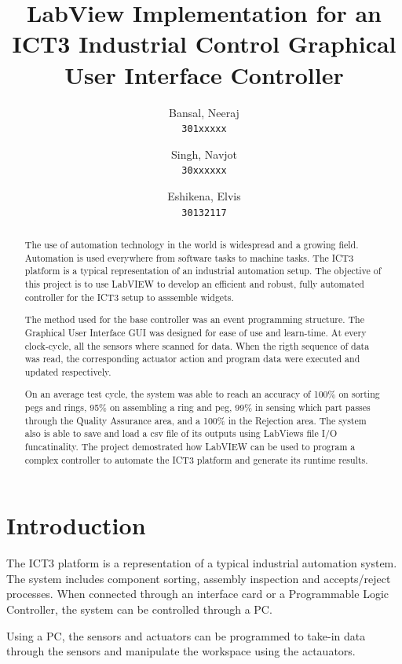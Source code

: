 \documentclass[12pt]{article}
\title{\textbf{LabView Implementation for an ICT3 Industrial Control Graphical User Interface Controller}}
\author{
  Bansal, Neeraj\\
  \texttt{301xxxxx}
  \and
  Singh, Navjot\\
  \texttt{30xxxxxx}
  \and
  Eshikena, Elvis\\
  \texttt{30132117}
}
\begin{document}
\maketitle

\begin{abstract}
The use of automation technology in the world is wide\-spread and a growing field.
Automation is used every\-where from software tasks to machine tasks. The ICT3 platform
is a typical representation of an industrial automation setup. The objective of this
project is to use LabVIEW to develop an efficient and robust, fully automated 
controller for the ICT3 setup to asssemble widgets.

The method used for the base controller was an event prog\-ramming struc\-ture. The
Graphical User Interface GUI was designed for ease of use and learn-time. At
every clock-cycle, all the sensors where scanned for data. When the rigth
sequence of data was read, the corresponding actuator action and program data
were executed and updated respectively.

On an average test cycle, the system was able to reach an accuracy of 100\% on
sorting pegs and rings, 95\% on assembling a ring and peg, 99\% in sensing
which part passes through the Quality Assurance area, and a 100\% in the Rejection
area. The system also is able to save and load a csv file of its outputs using LabViews
file I/O funcatinality. The project demostrated how LabVIEW can be used to program a 
complex controller to automate the ICT3 platform and generate its runtime results.
\end{abstract}
\newpage

\tableofcontents
\listoffigures
\listoftables
\newpage

\section{Introduction}
The ICT3 platform is a representation of a typical industrial automation 
system\cite{ictmanual}. The system includes component sorting, assembly inspection and 
accepts/reject processes. When connected through an interface card or a 
Programmable Logic Controller, the system can
be controlled through a PC.

Using a PC, the sensors and actuators can be programmed to
take-in data through the sensors and manipulate the workspace using the 
actauators.
\end{document}
